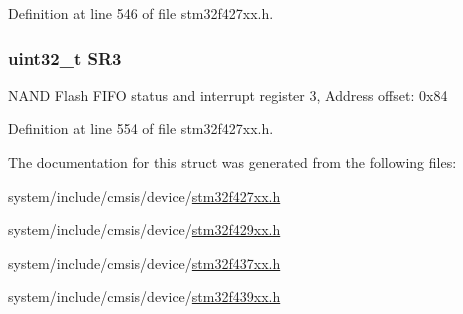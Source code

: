 Definition at line 546 of file stm32f427xx.\+h.

\subsubsection[{\texorpdfstring{S\+R3}{SR3}}]{ uint32\+\_\+t S\+R3}\hypertarget{struct_f_m_c___bank2__3___type_def_af30c34f7c606cb9416a413ec5fa36491}{}\label{struct_f_m_c___bank2__3___type_def_af30c34f7c606cb9416a413ec5fa36491}
N\+A\+ND Flash F\+I\+FO status and interrupt register 3, Address offset\+: 0x84 

Definition at line 554 of file stm32f427xx.\+h.



The documentation for this struct was generated from the following files\+:\begin{DoxyCompactItemize}
\item 
system/include/cmsis/device/\hyperlink{stm32f427xx_8h}{stm32f427xx.\+h}\item 
system/include/cmsis/device/\hyperlink{stm32f429xx_8h}{stm32f429xx.\+h}\item 
system/include/cmsis/device/\hyperlink{stm32f437xx_8h}{stm32f437xx.\+h}\item 
system/include/cmsis/device/\hyperlink{stm32f439xx_8h}{stm32f439xx.\+h}\end{DoxyCompactItemize}

